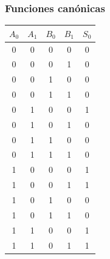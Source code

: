 \subsubsection{Funciones canónicas}
\begin{center}
    \begin{minipage}{0.5\textwidth}\centering
        \begin{tabular}{cccc|c}
\rowcolor[HTML]{FFCCC9} 
\textbf{$A_0$} & \textbf{$A_1$} & \textbf{$B_0$} & \textbf{$B_1$} & \cellcolor[HTML]{ECF4FF}\textbf{$S_0$} \\ \hline
0              & 0              & 0              & 0              & 0                                      \\
0              & 0              & 0              & 1              & 0                                      \\
0              & 0              & 1              & 0              & 0                                      \\
0              & 0              & 1              & 1              & 0                                      \\
0              & 1              & 0              & 0              & 1                                      \\
0              & 1              & 0              & 1              & 0                                      \\
0              & 1              & 1              & 0              & 0                                      \\
0              & 1              & 1              & 1              & 0                                      \\
1              & 0              & 0              & 0              & 1                                      \\
1              & 0              & 0              & 1              & 1                                      \\
1              & 0              & 1              & 0              & 0                                      \\
1              & 0              & 1              & 1              & 0                                      \\
1              & 1              & 0              & 0              & 1                                      \\
1              & 1              & 0              & 1              & 1                                      \\

\end{tabular}
\end{minipage}
\end{center}
